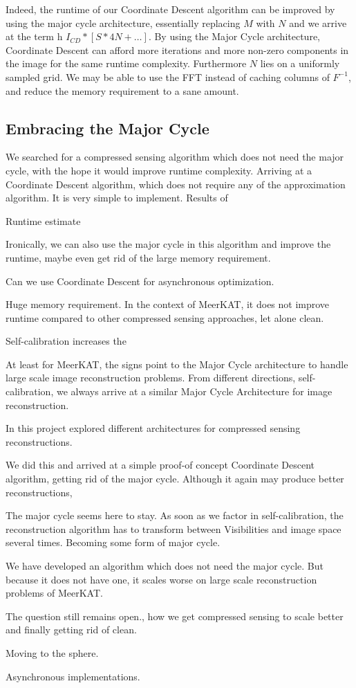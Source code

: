 Indeed, the runtime of our Coordinate Descent algorithm can be improved by using the major cycle architecture, essentially replacing $M$ with $N$ and we arrive at the term
h $I_{CD} * [S * 4N +\ldots]$. By using the Major Cycle architecture, Coordinate Descent can afford more iterations and more non-zero components in the image for the same runtime complexity. Furthermore $N$ lies on a uniformly sampled grid. We may be able to use the FFT instead of caching columns of $F^{-1}$, and reduce the memory requirement to a sane amount.


\subsection{Embracing the Major Cycle}
We searched for a compressed sensing algorithm which does not need the major cycle, with the hope it would improve runtime complexity. Arriving at a Coordinate Descent algorithm, which does not require any of the approximation algorithm. It is very simple to implement. Results of 

Runtime estimate

Ironically, we can also use the major cycle in this algorithm and improve the runtime, maybe even get rid of the large memory requirement.

Can we use Coordinate Descent for asynchronous optimization.

Huge memory requirement. In the context of MeerKAT, it does not improve runtime compared to other compressed sensing approaches, let alone clean.

Self-calibration increases the 

At least for MeerKAT, the signs point to the Major Cycle architecture to handle large scale image reconstruction problems. From different directions, self-calibration, we always arrive at a similar Major Cycle Architecture for image reconstruction.






In this project explored different architectures for compressed sensing reconstructions. 

We did this and arrived at a simple proof-of concept Coordinate Descent algorithm, getting rid of the major cycle. Although it again may produce better reconstructions,

The major cycle seems here to stay. As soon as we factor in self-calibration, the reconstruction algorithm has to transform between Visibilities and image space several times. Becoming some form of major cycle.

We have developed an algorithm which does not need the major cycle. But because it does not have one, it scales worse on large scale reconstruction problems of MeerKAT.

The question still remains open., how we get compressed sensing to scale better and finally getting rid of clean. 

Moving to the sphere.

Asynchronous implementations.
 

